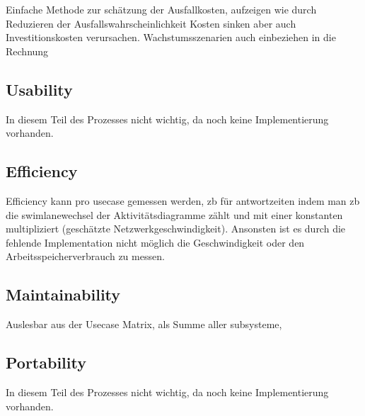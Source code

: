 Einfache Methode zur schätzung der Ausfallkosten, aufzeigen wie durch Reduzieren der Ausfallswahrscheinlichkeit Kosten sinken aber auch Investitionskosten verursachen. Wachstumsszenarien auch einbeziehen in die Rechnung
\subsection{Usability}
In diesem Teil des Prozesses nicht wichtig, da noch keine Implementierung vorhanden.

\subsection{Efficiency}
Efficiency kann pro usecase gemessen werden, zb für antwortzeiten indem man zb die swimlanewechsel der Aktivitätsdiagramme zählt und mit einer konstanten multipliziert (geschätzte Netzwerkgeschwindigkeit). Ansonsten ist es durch die fehlende Implementation nicht möglich die Geschwindigkeit oder den Arbeitsspeicherverbrauch zu messen.

\subsection{Maintainability}
Auslesbar aus der Usecase Matrix, als Summe aller subsysteme,

\subsection{Portability}
In diesem Teil des Prozesses nicht wichtig, da noch keine Implementierung vorhanden.
